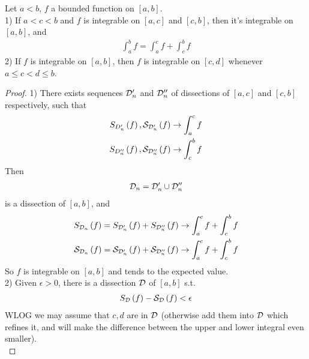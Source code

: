 \documentclass[a4paper]{article}
\begin{document}
\begin{thm}
Let $a<b$, $f$ a bounded function on $\left[a,b\right]$.\\
1) If $a<c<b$ and $f$ is integrable on $\left[a,c\right]$ and $\left[c,b\right]$, then it's integrable on $\left[a,b\right]$, and
\begin{equation*}
\begin{aligned}
\int_a^b f = \int_a^c f + \int_c^b f
\end{aligned}
\end{equation*}
2) If $f$ is integrable on $\left[a,b\right]$, then $f$ is integrable on $\left[c,d\right]$ whenever $a\leq c<d\leq b$.
\begin{proof}
1) There exists sequences $\mathcal{D}_n'$ and $\mathcal{D}_n''$ of dissections of $\left[a,c\right]$ and $\left[c,b\right]$ respectively, such that
\begin{equation*}
\begin{aligned}
S_{D'_n} \left(f\right), \mathcal{S}_{\mathcal{D}'_n} \left(f\right) \to \int_a^c f\\
S_{D''_n} \left(f\right), \mathcal{S}_{\mathcal{D}''_n} \left(f\right) \to \int_c^b f
\end{aligned}
\end{equation*}
Then
\begin{equation*}
\begin{aligned}
\mathcal{D}_n = \mathcal{D}'_n \cup \mathcal{D}''_n
\end{aligned}
\end{equation*}
is a dissection of $\left[a,b\right]$, and
\begin{equation*}
\begin{aligned}
S_{\mathcal{D}_n} \left(f\right) = S_{\mathcal{D}'_n}\left(f\right) + S_{\mathcal{D}''_n} \left(f\right) \to \int_a^c f + \int_c^b f\\
\mathcal{S}_{\mathcal{D}_n} \left(f\right) = \mathcal{S}_{\mathcal{D}'_n}\left(f\right) + \mathcal{S}_{\mathcal{D}''_n} \left(f\right) \to \int_a^c f + \int_c^b f
\end{aligned}
\end{equation*}
So $f$ is integrable on $\left[a,b\right]$ and tends to the expected value.\\
2) Given $\epsilon>0$, there is a dissection $\mathcal{D}$ of $\left[a,b\right]$ s.t.
\begin{equation*}
\begin{aligned}
S_{\mathcal{D}} \left(f\right) - \mathcal{S}_{\mathcal{D}} \left(f\right) < \epsilon
\end{aligned}
\end{equation*}
WLOG we may assume that $c,d$ are in $\mathcal{D}$ (otherwise add them into $\mathcal{D}$ which refines it, and will make the difference between the upper and lower integral even smaller).\\

\end{proof}
\end{thm}
\end{document}

